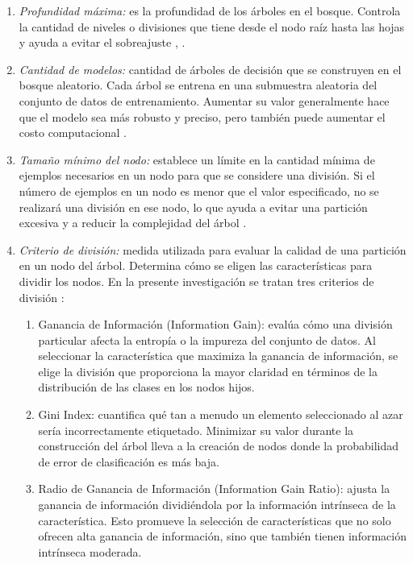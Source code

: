 	\begin{enumerate}
	\item \textit{Profundidad máxima:} es la profundidad de los árboles en el bosque. Controla la cantidad de niveles o divisiones que tiene desde el nodo raíz hasta las hojas y ayuda a evitar el sobreajuste \citep{lakshmanan2021practical}, \citep{hastie2009elements}.
	\item \textit{Cantidad de modelos:} cantidad de árboles de decisión que se construyen en el bosque aleatorio. Cada árbol se entrena en una submuestra aleatoria del conjunto de datos de entrenamiento. Aumentar su valor generalmente hace que el modelo sea más robusto y preciso, pero también puede aumentar el costo computacional \citep{lakshmanan2021practical}.
	\item \textit{Tamaño mínimo del nodo:} establece un límite en la cantidad mínima de ejemplos necesarios en un nodo para que se considere una división. Si el número de ejemplos en un nodo es menor que el valor especificado, no se realizará una división en ese nodo, lo que ayuda a evitar una partición excesiva y a reducir la complejidad del árbol \citep{lakshmanan2021practical}.
	\item \textit{Criterio de división:} medida utilizada para evaluar la calidad de una partición en un nodo del árbol. Determina cómo se eligen las características para dividir los nodos. En la presente investigación se tratan tres criterios de división \citep{gupta2017analysis}:
	\begin{enumerate}
		\item Ganancia de Información (Information Gain): evalúa cómo una división particular afecta la entropía o la impureza del conjunto de datos. Al seleccionar la característica que maximiza la ganancia de información, se elige la división que proporciona la mayor claridad en términos de la distribución de las clases en los nodos hijos. 
		\item Gini Index: cuantifica qué tan a menudo un elemento seleccionado al azar sería incorrectamente etiquetado. Minimizar su valor durante la construcción del árbol lleva a la creación de nodos donde la probabilidad de error de clasificación es más baja. 
		\item Radio de Ganancia de Información (Information Gain Ratio): ajusta la ganancia de información dividiéndola por la información intrínseca de la característica. Esto promueve la selección de características que no solo ofrecen alta ganancia de información, sino que también tienen información intrínseca moderada. 
	\end{enumerate}
\end{enumerate}

